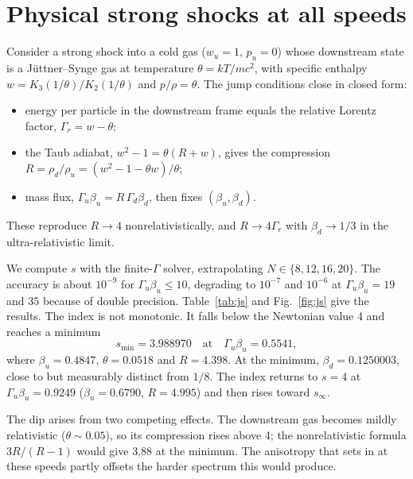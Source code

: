 \documentclass[aps,prd,twocolumn,superscriptaddress,nofootinbib,floatfix]{revtex4-2}
\newcommand{\sinf}{s_\infty}
\newcommand{\bd}{\beta_d}
\newcommand{\bu}{\beta_u}
\begin{document}
\section{Physical strong shocks at all speeds}
\label{sec:js}

Consider a strong shock into a cold gas ($w_u=1$, $p_u=0$) whose downstream state is a J\"uttner--Synge gas at
temperature $\theta=kT/mc^2$, with specific enthalpy $w=K_3(1/\theta)/K_2(1/\theta)$ and $p/\rho=\theta$. The
jump conditions close in closed form:
\begin{itemize}
\item energy per particle in the downstream frame equals the relative Lorentz factor, $\Gamma_r=w-\theta$;
\item the Taub adiabat, $w^2-1=\theta(R+w)$, gives the compression $R=\rho_d/\rho_u=(w^2-1-\theta w)/\theta$;
\item mass flux, $\Gamma_u\bu=R\,\Gamma_d\bd$, then fixes $(\bu,\bd)$.
\end{itemize}
These reproduce $R\to4$ nonrelativistically, and $R\to4\Gamma_r$ with $\bd\to1/3$ in the ultra-relativistic limit.

We compute $s$ with the finite-$\Gamma$ solver, extrapolating $N\in\{8,12,16,20\}$. The accuracy is about
$10^{-9}$ for $\Gamma_u\bu\le10$, degrading to $10^{-7}$ and $10^{-6}$ at $\Gamma_u\bu=19$ and $35$ because of
double precision. Table~\ref{tab:js} and Fig.~\ref{fig:js} give the results. The index is not monotonic. It
falls below the Newtonian value 4 and reaches a minimum
\begin{equation}
s_{\min}=3.988970\quad\text{at}\quad\Gamma_u\bu=0.5541,
\end{equation}
where $\bu=0.4847$, $\theta=0.0518$ and $R=4.398$.
At the minimum, $\bd=0.1250003$, close to but measurably distinct from $1/8$. The index returns to $s=4$ at
$\Gamma_u\bu=0.9249$ ($\bu=0.6790$, $R=4.995$) and then rises toward $\sinf$.

The dip arises from two competing effects. The downstream gas becomes mildly relativistic ($\theta\sim0.05$), so
its compression rises above 4; the nonrelativistic formula $3R/(R-1)$ would give $3.88$ at the minimum. The
anisotropy that sets in at these speeds partly offsets the harder spectrum this would produce.
\end{document}
